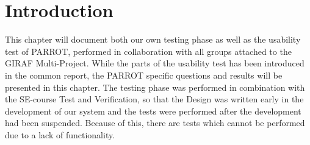 \section{Introduction}
This chapter will document both our own testing phase as well as the usability test of PARROT, performed in collaboration with all groups attached to the GIRAF Multi-Project.
While the parts of the usability test has been introduced in the common report, the PARROT specific questions and results will be presented in this chapter.
The testing phase was performed in combination with the SE-course Test and Verification, so that the Design was written early in the development of our system and the tests were performed after the development had been suspended.
Because of this, there are tests which cannot be performed due to a lack of functionality.